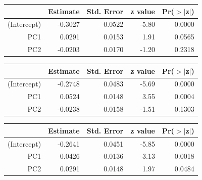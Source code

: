 \documentclass[a4paper,12pt]{Latex/Classes/PhDthesisPSnPDF}
\begin{document}
\begin{center}
\begin{table}[ht]
\centering
\begin{tabular}{rrrrr}
  \hline
 & Estimate & Std. Error & z value & Pr($>$$|$z$|$) \\ 
  \hline
(Intercept) & -0.3027 & 0.0522 & -5.80 & 0.0000 \\ 
  PC1 & 0.0291 & 0.0153 & 1.91 & 0.0565 \\ 
  PC2 & -0.0203 & 0.0170 & -1.20 & 0.2318 \\ 
   \hline
\end{tabular}
\end{table}\end{center}

\begin{center}
\begin{table}[ht]
\centering
\begin{tabular}{rrrrr}
  \hline
 & Estimate & Std. Error & z value & Pr($>$$|$z$|$) \\ 
  \hline
(Intercept) & -0.2748 & 0.0483 & -5.69 & 0.0000 \\ 
  PC1 & 0.0524 & 0.0148 & 3.55 & 0.0004 \\ 
  PC2 & -0.0238 & 0.0158 & -1.51 & 0.1303 \\ 
   \hline
\end{tabular}
\end{table}\end{center}

\newpage

\begin{center}
\begin{table}[ht]
\centering
\begin{tabular}{rrrrr}
  \hline
 & Estimate & Std. Error & z value & Pr($>$$|$z$|$) \\ 
  \hline
(Intercept) & -0.2641 & 0.0451 & -5.85 & 0.0000 \\ 
  PC1 & -0.0426 & 0.0136 & -3.13 & 0.0018 \\ 
  PC2 & 0.0291 & 0.0148 & 1.97 & 0.0484 \\ 
   \hline
\end{tabular}
\end{table}\end{center}
\end{document}

